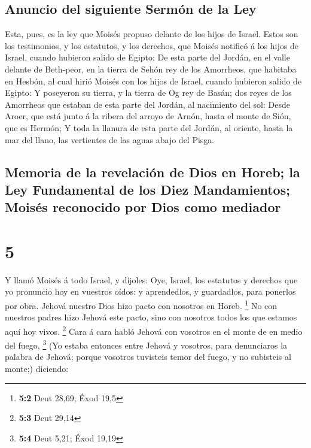 \hypertarget{anuncio-del-siguiente-sermuxf3n-de-la-ley}{%
\subsection{Anuncio del siguiente Sermón de la
Ley}\label{anuncio-del-siguiente-sermuxf3n-de-la-ley}}

 Esta, pues, es la ley que Moisés propuso delante de los
hijos de Israel.  Estos son los testimonios, y los
estatutos, y los derechos, que Moisés notificó á los hijos de Israel,
cuando hubieron salido de Egipto;  De esta parte del
Jordán, en el valle delante de Beth-peor, en la tierra de Sehón rey de
los Amorrheos, que habitaba en Hesbón, al cual hirió Moisés con los
hijos de Israel, cuando hubieron salido de Egipto:  Y
poseyeron su tierra, y la tierra de Og rey de Basán; dos reyes de los
Amorrheos que estaban de esta parte del Jordán, al nacimiento del sol:
 Desde Aroer, que está junto á la ribera del arroyo de
Arnón, hasta el monte de Sión, que es Hermón;  Y toda la
llanura de esta parte del Jordán, al oriente, hasta la mar del llano,
las vertientes de las aguas abajo del Pisga.

\hypertarget{memoria-de-la-revelaciuxf3n-de-dios-en-horeb-la-ley-fundamental-de-los-diez-mandamientos-moisuxe9s-reconocido-por-dios-como-mediador}{%
\subsection{Memoria de la revelación de Dios en Horeb; la Ley
Fundamental de los Diez Mandamientos; Moisés reconocido por Dios como
mediador}\label{memoria-de-la-revelaciuxf3n-de-dios-en-horeb-la-ley-fundamental-de-los-diez-mandamientos-moisuxe9s-reconocido-por-dios-como-mediador}}

\hypertarget{section-4}{%
\section{5}\label{section-4}}

 Y llamó Moisés á todo Israel, y díjoles: Oye, Israel, los
estatutos y derechos que yo pronuncio hoy en vuestros oídos: y
aprendedlos, y guardadlos, para ponerlos por obra.  Jehová
nuestro Dios hizo pacto con nosotros en Horeb. \footnote{\textbf{5:2}
  Deut 28,69; Éxod 19,5}  No con nuestros padres hizo
Jehová este pacto, sino con nosotros todos los que estamos aquí hoy
vivos. \footnote{\textbf{5:3} Deut 29,14}  Cara á cara
habló Jehová con vosotros en el monte de en medio del fuego, \footnote{\textbf{5:4}
  Deut 5,21; Éxod 19,19}  (Yo estaba entonces entre Jehová
y vosotros, para denunciaros la palabra de Jehová; porque vosotros
tuvisteis temor del fuego, y no subisteis al monte;) diciendo:

